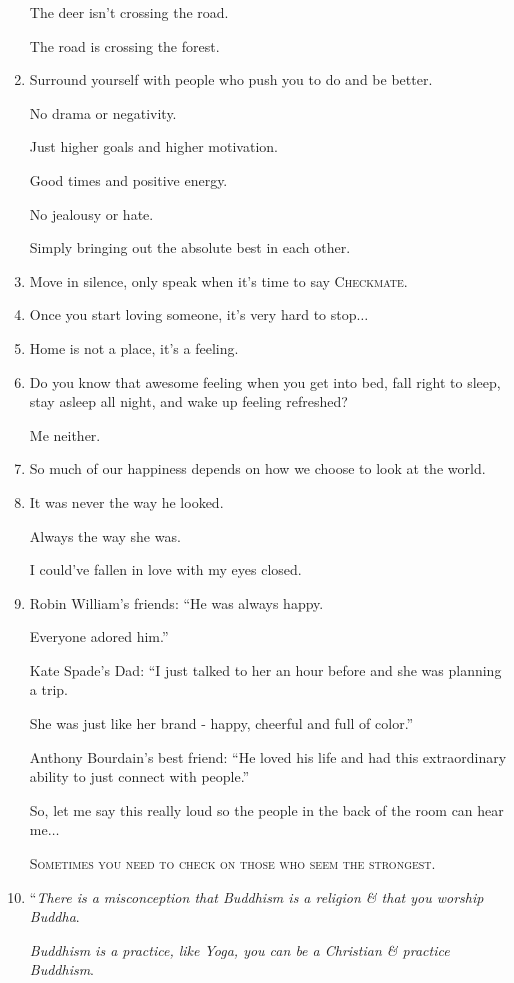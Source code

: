 \documentclass{article}
\begin{document}
\begin{enumerate}
	The deer isn't crossing the road.
	
	The road is crossing the forest.
	\item Surround yourself with people who push you to do and be better.
	
	No drama or negativity.
	
	Just higher goals and higher motivation.
	
	Good times and positive energy.
	
	No jealousy or hate.
	
	Simply bringing out the absolute best in each other.
	\item Move in silence, only speak when it's time to say \textsc{Checkmate}.
	\item Once you start loving someone, it's very hard to stop$\ldots$
	\item Home is not a place, it's a feeling.
	\item Do you know that awesome feeling when you get into bed, fall right to sleep, stay asleep all night, and wake up feeling refreshed?
	
	Me neither.
	\item So much of our happiness depends on how we choose to look at the world.
	\item It was never the way he looked.
	
	Always the way she was.
	
	I could've fallen in love with my eyes closed.
	\item Robin William's friends: ``He was always happy.
	
	Everyone adored him.''
	
	Kate Spade's Dad: ``I just talked to her an hour before and she was planning a trip.
	
	She was just like her brand - happy, cheerful and full of color.''
	
	Anthony Bourdain's best friend: ``He loved his life and had this extraordinary ability to just connect with people.''
	
	So, let me say this really loud so the people in the back of the room can hear me$\ldots$
	
	\textsc{Sometimes you need to check on those who seem the strongest}.
	\item ``\textit{There is a misconception that Buddhism is a religion \& that you worship Buddha}.
	
	\textit{Buddhism is a practice, like Yoga, you can be a Christian \& practice Buddhism}.
	

\end{enumerate}
\end{document}
